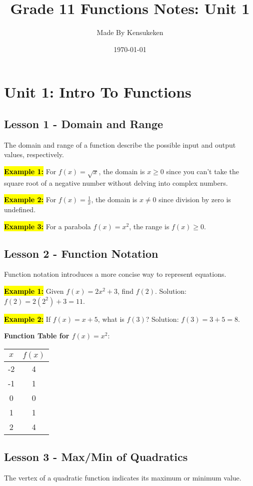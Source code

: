 \documentclass[12pt,a4paper]{article}
\title{Grade 11 Functions Notes: Unit 1}
\author{Made By Kensukeken}
\date{\today}
\begin{document}
\maketitle

\section*{Unit 1: Intro To Functions}

\subsection*{Lesson 1 - Domain and Range}
The domain and range of a function describe the possible input and output values, respectively.



\textbf{\hl{Example 1:}} For \(f(x) = \sqrt{x}\), the domain is \(x \geq 0\) since you can't take the square root of a negative number without delving into complex numbers.

\textbf{\hl{Example 2:}} For \(f(x) = \frac{1}{x}\), the domain is \(x \neq 0\) since division by zero is undefined.

\textbf{\hl{Example 3:}} For a parabola \(f(x) = x^2\), the range is \(f(x) \geq 0\).

\subsection*{Lesson 2 - Function Notation}
Function notation introduces a more concise way to represent equations.

\textbf{\hl{Example 1:}} Given \(f(x) = 2x^2 + 3\), find \(f(2)\). Solution: \(f(2) = 2(2^2) + 3 = 11\).

\textbf{\hl{Example 2:}} If \(f(x) = x + 5\), what is \(f(3)\)? Solution: \(f(3) = 3 + 5 = 8\).

\textbf{Function Table for \(f(x) = x^2\)}:
\begin{center}
    \begin{tabular}{c|c}
        \( x \) & \( f(x) \) \\
        \hline
        -2 & 4 \\
        -1 & 1 \\
        0 & 0 \\
        1 & 1 \\
        2 & 4 \\
    \end{tabular}
\end{center}
\newpage
\subsection*{Lesson 3 - Max/Min of Quadratics}
The vertex of a quadratic function indicates its maximum or minimum value.
\end{document}
